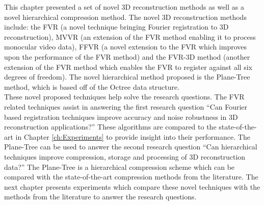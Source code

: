 
This chapter presented a set of novel 3D reconstruction methods as well as a novel hierarchical compression method. The novel 3D reconstruction methods include: the FVR (a novel technique bringing Fourier registration to 3D reconstruction), MVVR (an extension of the FVR method enabling it to process monocular video data), FFVR (a novel extension to the FVR which improves upon the performance of the FVR method) and the FVR-3D method (another extension of the FVR method which enables the FVR to register against all six degrees of freedom). The novel hierarchical method proposed is the Plane-Tree method, which is based off of the Octree data structure. \\

These novel proposed techniques help solve the research questions. The FVR related techniques assist in answering the first research question ``Can Fourier based registration techniques improve accuracy and noise robustness in 3D reconstruction applications?'' These algorithms are compared to the state-of-the-art in Chapter \ref{ch:Experiments} to provide insight into their performance. The Plane-Tree can be used to answer the second research question ``Can hierarchical techniques improve compression, storage and processing of 3D reconstruction data?'' The Plane-Tree is a hierarchical compression scheme which can be compared with the state-of-the-art compression methods from the literature. The next chapter presents experiments which compare these novel techniques with the methods from the literature to answer the research questions. \\
